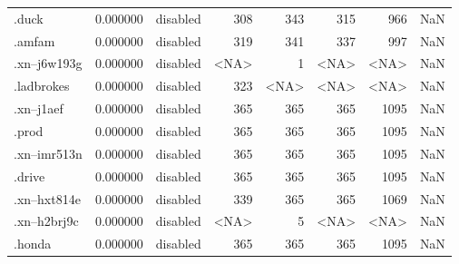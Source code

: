 \begin{tabular}{lrlrrrrl}
.duck                     &          0.000000 &        disabled &                         308 &                         343 &                         315 &                 966 &                  NaN \\
.amfam                    &          0.000000 &        disabled &                         319 &                         341 &                         337 &                 997 &                  NaN \\
.xn--j6w193g              &          0.000000 &        disabled &                        <NA> &                           1 &                        <NA> &                <NA> &                  NaN \\
.ladbrokes                &          0.000000 &        disabled &                         323 &                        <NA> &                        <NA> &                <NA> &                  NaN \\
.xn--j1aef                &          0.000000 &        disabled &                         365 &                         365 &                         365 &                1095 &                  NaN \\
.prod                     &          0.000000 &        disabled &                         365 &                         365 &                         365 &                1095 &                  NaN \\
.xn--imr513n              &          0.000000 &        disabled &                         365 &                         365 &                         365 &                1095 &                  NaN \\
.drive                    &          0.000000 &        disabled &                         365 &                         365 &                         365 &                1095 &                  NaN \\
.xn--hxt814e              &          0.000000 &        disabled &                         339 &                         365 &                         365 &                1069 &                  NaN \\
.xn--h2brj9c              &          0.000000 &        disabled &                        <NA> &                           5 &                        <NA> &                <NA> &                  NaN \\
.honda                    &          0.000000 &        disabled &                         365 &                         365 &                         365 &                1095 &                  NaN \\

\end{tabular}

